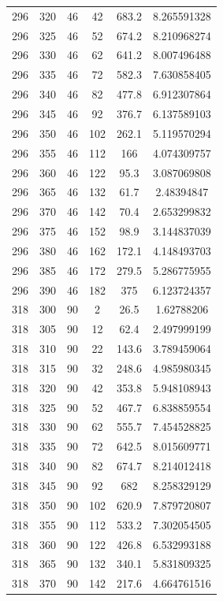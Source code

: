 \documentclass{article}
\begin{document}
\begin{table}[H]
{\begin{tabular}{cccccc}
    296 & 320 & 46 & 42 & 683.2 & 8.265591328 \\
    296 & 325 & 46 & 52 & 674.2 & 8.210968274 \\
    296 & 330 & 46 & 62 & 641.2 & 8.007496488 \\
    296 & 335 & 46 & 72 & 582.3 & 7.630858405 \\
    296 & 340 & 46 & 82 & 477.8 & 6.912307864 \\
    296 & 345 & 46 & 92 & 376.7 & 6.137589103 \\
    296 & 350 & 46 & 102 & 262.1 & 5.119570294 \\
    296 & 355 & 46 & 112 & 166 & 4.074309757 \\
    296 & 360 & 46 & 122 & 95.3 & 3.087069808 \\
    296 & 365 & 46 & 132 & 61.7 & 2.48394847 \\
    296 & 370 & 46 & 142 & 70.4 & 2.653299832 \\
    296 & 375 & 46 & 152 & 98.9 & 3.144837039 \\
    296 & 380 & 46 & 162 & 172.1 & 4.148493703 \\
    296 & 385 & 46 & 172 & 279.5 & 5.286775955 \\
    296 & 390 & 46 & 182 & 375 & 6.123724357 \\
    318 & 300 & 90 & 2 & 26.5 & 1.62788206 \\
    318 & 305 & 90 & 12 & 62.4 & 2.497999199 \\
    318 & 310 & 90 & 22 & 143.6 & 3.789459064 \\
    318 & 315 & 90 & 32 & 248.6 & 4.985980345 \\
    318 & 320 & 90 & 42 & 353.8 & 5.948108943 \\
    318 & 325 & 90 & 52 & 467.7 & 6.838859554 \\
    318 & 330 & 90 & 62 & 555.7 & 7.454528825 \\
    318 & 335 & 90 & 72 & 642.5 & 8.015609771 \\
    318 & 340 & 90 & 82 & 674.7 & 8.214012418 \\
    318 & 345 & 90 & 92 & 682 & 8.258329129 \\
    318 & 350 & 90 & 102 & 620.9 & 7.879720807 \\
    318 & 355 & 90 & 112 & 533.2 & 7.302054505 \\
    318 & 360 & 90 & 122 & 426.8 & 6.532993188 \\
    318 & 365 & 90 & 132 & 340.1 & 5.831809325 \\
    318 & 370 & 90 & 142 & 217.6 & 4.664761516 \\

\end{tabular}}
\end{table}
\end{document}
